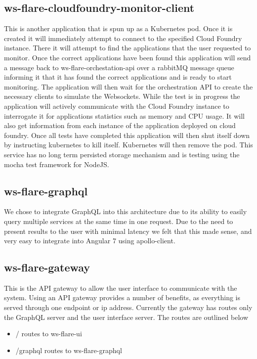 \subsection{ws-flare-cloudfoundry-monitor-client}

This is another application that is spun up as a Kubernetes pod. Once it is created it will immediately attempt to connect to the specified Cloud Foundry instance. There it will attempt to find the applications that the user requested to monitor. Once the correct applications have been found this application will send a message back to ws-flare-orchestation-api over a rabbitMQ message queue informing it that it has found the correct applications and is ready to start monitoring. The application will then wait for the orchestration API to create the necessary clients to simulate the Websockets. While the test is in progress the application will actively communicate with the Cloud Foundry instance to interrogate it for applications statistics such as memory and CPU usage. It will also get information from each instance of the application deployed on cloud foundry. Once all tests have completed this application will then shut itself down by instructing kubernetes to kill itself. Kubernetes will then remove the pod. This service has no long term persisted storage mechanism and is testing using the mocha test framework for NodeJS.

\subsection{ws-flare-graphql}

We chose to integrate GraphQL into this architecture due to its ability to easily query multiple services at the same time in one request. Due to the need to present results to the user with minimal latency we felt that this made sense, and very easy to integrate into Angular 7 using apollo-client. 

\subsection{ws-flare-gateway}

This is the API gateway to allow the user interface to communicate with the system. Using an API gateway provides a number of benefits, as everything is served through one endpoint or ip address. Currently the gateway has routes only the GraphQL server and the user interface server. The routes are outlined below

\begin{itemize}
  \item / routes to ws-flare-ui
  \item /graphql routes to ws-flare-graphql
\end{itemize}

